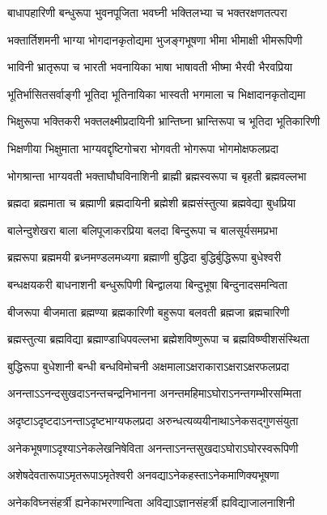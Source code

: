 \twolineshloka
{बाधापहारिणी बन्धुरूपा भुवनपूजिता}
{भवघ्नी भक्तिलभ्या च भक्तरक्षणतत्परा}%

\twolineshloka
{भक्तार्तिशमनी भाग्या भोगदानकृतोद्यमा}
{भुजङ्गभूषणा भीमा भीमाक्षी भीमरूपिणी}%

\twolineshloka
{भाविनी भ्रातृरूपा च भारती भवनायिका}
{भाषा भाषावती भीष्मा भैरवी भैरवप्रिया}%

\twolineshloka
{भूतिर्भासितसर्वाङ्गी भूतिदा भूतिनायिका}
{भास्वती भगमाला च भिक्षादानकृतोद्यमा}%

\twolineshloka
{भिक्षुरूपा भक्तिकरी भक्तलक्ष्मीप्रदायिनी}
{भ्रान्तिघ्ना भ्रान्तिरूपा च भूतिदा भूतिकारिणी}%

\twolineshloka
{भिक्षणीया भिक्षुमाता भाग्यवद्दृष्टिगोचरा}
{भोगवती भोगरूपा भोगमोक्षफलप्रदा}%

\twolineshloka
{भोगश्रान्ता भाग्यवती भक्ताघौघविनाशिनी}
{ब्राह्मी ब्रह्मस्वरूपा च बृहती ब्रह्मवल्लभा}%

\twolineshloka
{ब्रह्मदा ब्रह्ममाता च ब्रह्माणी ब्रह्मदायिनी}
{ब्रह्मेशी ब्रह्मसंस्तुत्या ब्रह्मवेद्या बुधप्रिया}%

\twolineshloka
{बालेन्दुशेखरा बाला बलिपूजाकरप्रिया}
{बलदा बिन्दुरूपा च बालसूर्यसमप्रभा}%

\twolineshloka
{ब्रह्मरूपा ब्रह्ममयी ब्रध्नमण्डलमध्यगा}
{ब्रह्माणी बुद्धिदा बुद्धिर्बुद्धिरूपा बुधेश्वरी}%

\twolineshloka
{बन्धक्षयकरी बाधनाशनी बन्धुरूपिणी}
{बिन्द्वालया बिन्दुभूषा बिन्दुनादसमन्विता}%

\twolineshloka
{बीजरूपा बीजमाता ब्रह्मण्या ब्रह्मकारिणी}
{बहुरूपा बलवती ब्रह्मजा ब्रह्मचारिणी}%

\twolineshloka
{ब्रह्मस्तुत्या ब्रह्मविद्या ब्रह्माण्डाधिपवल्लभा}
{ब्रह्मेशविष्णुरूपा च ब्रह्मविष्ण्वीशसंस्थिता}%

\twolineshloka
{बुद्धिरूपा बुधेशानी बन्धी बन्धविमोचनी}
{अक्षमालाऽक्षराकाराऽक्षराऽक्षरफलप्रदा}%

\twolineshloka
{अनन्ताऽऽनन्दसुखदाऽनन्तचन्द्रनिभानना}
{अनन्तमहिमाऽघोराऽनन्तगम्भीरसम्मिता}%

\twolineshloka
{अदृष्टाऽदृष्टदाऽनन्ताऽदृष्टभाग्यफलप्रदा}
{अरुन्धत्यव्ययीनाथाऽनेकसद्गुणसंयुता}%

\twolineshloka
{अनेकभूषणाऽदृश्याऽनेकलेखनिषेविता}
{अनन्ताऽनन्तसुखदाऽघोराऽघोरस्वरूपिणी}%

\twolineshloka
{अशेषदेवतारूपाऽमृतरूपाऽमृतेश्वरी}
{अनवद्याऽनेकहस्ताऽनेकमाणिक्यभूषणा}%

\twolineshloka
{अनेकविघ्नसंहर्त्री ह्यनेकाभरणान्विता}
{अविद्याऽज्ञानसंहर्त्री ह्यविद्याजालनाशिनी}%

